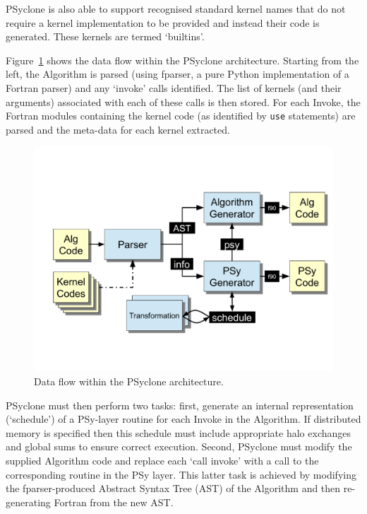 \documentclass[times]{elsarticle}
\begin{document}
PSyclone is also able to support recognised standard kernel names that
do not require a kernel implementation to be provided and instead
their code is generated. These kernels are termed `builtins'.

Figure~\ref{fig:psyclone-arch} shows the data flow within the PSyclone
architecture.  Starting from the left, the Algorithm is parsed (using
fparser, a pure Python implementation of a Fortran parser) and any
`invoke' calls identified. The list of kernels (and their arguments)
associated with each of these calls is then stored. For each Invoke,
the Fortran modules containing the kernel code (as identified by
\texttt{use} statements) are parsed and the meta-data for each kernel
extracted.

\begin{figure}
\centering\includegraphics[width=0.8\linewidth]{psyclone_flow.pdf}
\caption{\label{fig:psyclone-arch}Data flow within the PSyclone architecture.}
\end{figure}

PSyclone must then perform two tasks: first, generate an internal
representation (`schedule') of a PSy-layer routine for each Invoke in
the Algorithm. If distributed memory is specified then this schedule
must include appropriate halo exchanges and global sums to ensure
correct execution. Second, PSyclone must modify the supplied Algorithm
code and replace each `call invoke' with a call to the corresponding
routine in the PSy layer. This latter task is achieved by modifying
the fparser-produced Abstract Syntax Tree (AST) of the Algorithm and
then re-generating Fortran from the new AST.
\end{document}
